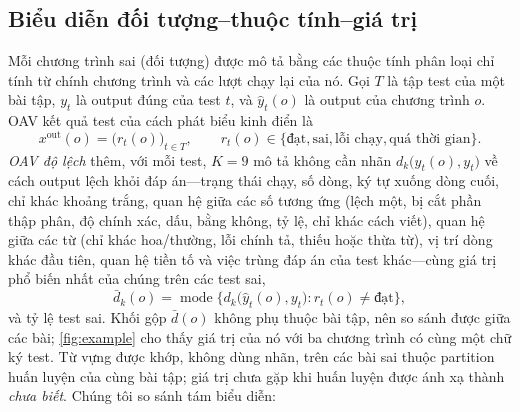 \subsection{Biểu diễn đối tượng--thuộc tính--giá trị}\label{sec:reps}
Mỗi chương trình sai (đối tượng) được mô tả bằng các thuộc tính phân loại chỉ tính từ chính chương trình và các lượt chạy lại của nó. Gọi $T$ là tập test của một bài tập, $y_t$ là output đúng của test $t$, và $\hat y_t(o)$ là output của chương trình $o$. OAV kết quả test của cách phát biểu kinh điển là
\begin{equation}
x^{\mathrm{out}}(o) = \bigl(r_t(o)\bigr)_{t \in T}, \qquad r_t(o) \in \{\text{đạt}, \text{sai}, \text{lỗi chạy}, \text{quá thời gian}\}.
\end{equation}
\emph{OAV độ lệch} thêm, với mỗi test, $K = 9$ mô tả không cần nhãn $d_k\bigl(\hat y_t(o), y_t\bigr)$ về cách output lệch khỏi đáp án---trạng thái chạy, số dòng, ký tự xuống dòng cuối, chỉ khác khoảng trắng, quan hệ giữa các số tương ứng (lệch một, bị cắt phần thập phân, độ chính xác, dấu, bằng không, tỷ lệ, chỉ khác cách viết), quan hệ giữa các từ (chỉ khác hoa/thường, lỗi chính tả, thiếu hoặc thừa từ), vị trí dòng khác đầu tiên, quan hệ tiền tố và việc trùng đáp án của test khác---cùng giá trị phổ biến nhất của chúng trên các test sai,
\begin{equation}
\bar d_k(o) = \operatorname{mode}\bigl\{ d_k\bigl(\hat y_t(o), y_t\bigr) : r_t(o) \neq \text{đạt} \bigr\},
\end{equation}
và tỷ lệ test sai. Khối gộp $\bar d(o)$ không phụ thuộc bài tập, nên so sánh được giữa các bài; \cref{fig:example} cho thấy giá trị của nó với ba chương trình có cùng một chữ ký test. Từ vựng được khớp, không dùng nhãn, trên các bài sai thuộc partition huấn luyện của cùng bài tập; giá trị chưa gặp khi huấn luyện được ánh xạ thành \emph{chưa biết}. Chúng tôi so sánh tám biểu diễn:
